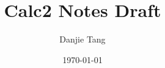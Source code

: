 

\title{Calc2 Notes Draft}
\date{\today}
\author{Danjie Tang}


	
	
	
	
	
	
	
	
	
	
	
	
	
	
	
	
	
	
	
	
	
	
	
	
	
